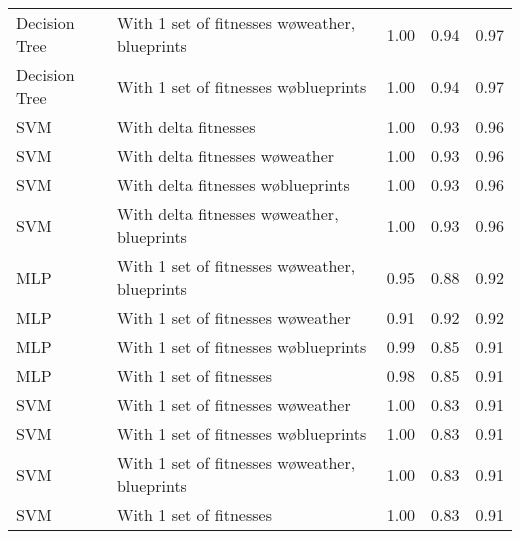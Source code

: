 \begin{tabular}{llrrr}
 Decision Tree & With 1 set of fitnesses w\o weather, blueprints &       1.00 &    0.94 & 0.97 \\
 Decision Tree &          With 1 set of fitnesses w\o blueprints &       1.00 &    0.94 & 0.97 \\
           SVM &                            With delta fitnesses &       1.00 &    0.93 & 0.96 \\
           SVM &                With delta fitnesses w\o weather &       1.00 &    0.93 & 0.96 \\
           SVM &             With delta fitnesses w\o blueprints &       1.00 &    0.93 & 0.96 \\
           SVM &    With delta fitnesses w\o weather, blueprints &       1.00 &    0.93 & 0.96 \\
           MLP & With 1 set of fitnesses w\o weather, blueprints &       0.95 &    0.88 & 0.92 \\
           MLP &             With 1 set of fitnesses w\o weather &       0.91 &    0.92 & 0.92 \\
           MLP &          With 1 set of fitnesses w\o blueprints &       0.99 &    0.85 & 0.91 \\
           MLP &                         With 1 set of fitnesses &       0.98 &    0.85 & 0.91 \\
           SVM &             With 1 set of fitnesses w\o weather &       1.00 &    0.83 & 0.91 \\
           SVM &          With 1 set of fitnesses w\o blueprints &       1.00 &    0.83 & 0.91 \\
           SVM & With 1 set of fitnesses w\o weather, blueprints &       1.00 &    0.83 & 0.91 \\
           SVM &                         With 1 set of fitnesses &       1.00 &    0.83 & 0.91 \\
\bottomrule
\end{tabular}
